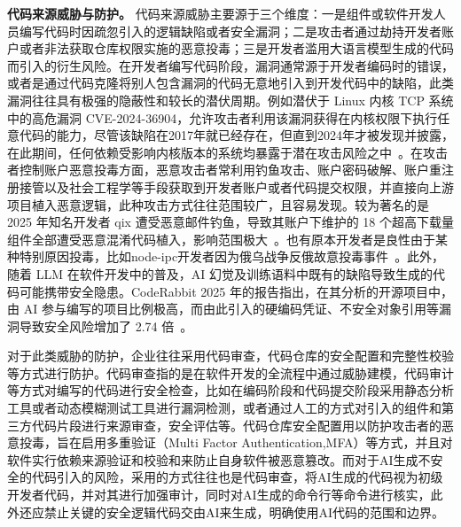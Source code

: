 \textbf{代码来源威胁与防护。}
代码来源威胁主要源于三个维度：一是组件或软件开发人员编写代码时因疏忽引入的逻辑缺陷或者安全漏洞；二是攻击者通过劫持开发者账户或者非法获取仓库权限实施的恶意投毒；三是开发者滥用大语言模型生成的代码而引入的衍生风险。在开发者编写代码阶段，漏洞通常源于开发者编码时的错误，或者是通过代码克隆将别人包含漏洞的代码无意地引入到开发代码中的缺陷，此类漏洞往往具有极强的隐蔽性和较长的潜伏周期。例如潜伏于 Linux 内核 TCP 系统中的高危漏洞 CVE-2024-36904，允许攻击者利用该漏洞获得在内核权限下执行任意代码的能力，尽管该缺陷在2017年就已经存在，但直到2024年才被发现并披露，在此期间，任何依赖受影响内核版本的系统均暴露于潜在攻击风险之中~\cite{freebuf-uafvulnerability}。在攻击者控制账户恶意投毒方面，恶意攻击者常利用钓鱼攻击、账户密码破解、账户重注册接管以及社会工程学等手段获取到开发者账户或者代码提交权限，并直接向上游项目植入恶意逻辑，此种攻击方式往往范围较广，且容易发现。较为著名的是 2025 年知名开发者 qix 遭受恶意邮件钓鱼，导致其账户下维护的 18 个超高下载量组件全部遭受恶意混淆代码植入，影响范围极大~\cite{4hou-npm-attack}。也有原本开发者是良性由于某种特别原因投毒，比如node-ipc开发者因为俄乌战争反俄故意投毒事件~\cite{nsfocus_nodeipc_2022}。此外，随着 LLM 在软件开发中的普及，AI 幻觉及训练语料中既有的缺陷导致生成的代码可能携带安全隐患。CodeRabbit 2025 年的报告指出，在其分析的开源项目中，由 AI 参与编写的项目比例极高，而由此引入的硬编码凭证、不安全对象引用等漏洞导致安全风险增加了 2.74 倍~\cite{coderabbit-ai-report}。

对于此类威胁的防护，企业往往采用代码审查，代码仓库的安全配置和完整性校验等方式进行防护。代码审查指的是在软件开发的全流程中通过威胁建模，代码审计等方式对编写的代码进行安全检查，比如在编码阶段和代码提交阶段采用静态分析工具或者动态模糊测试工具进行漏洞检测，或者通过人工的方式对引入的组件和第三方代码片段进行来源审查，安全评估等。代码仓库安全配置用以防护攻击者的恶意投毒，旨在启用多重验证（Multi Factor Authentication,MFA）等方式，并且对软件实行依赖来源验证和校验和来防止自身软件被恶意篡改。而对于AI生成不安全的代码引入的风险，采用的方式往往也是代码审查，将AI生成的代码视为初级开发者代码，并对其进行加强审计，同时对AI生成的命令行等命令进行核实，此外还应禁止关键的安全逻辑代码交由AI来生成，明确使用AI代码的范围和边界。

